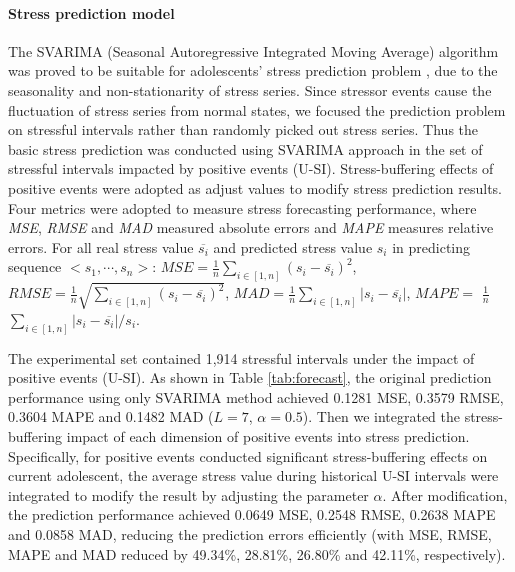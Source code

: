 \paragraph{Stress prediction model}
The SVARIMA (Seasonal Autoregressive Integrated Moving Average) algorithm was proved to be suitable for adolescents' stress prediction problem \citep{Li2015Predicting, Shumway2006Time},
due to the seasonality and non-stationarity of stress series.
Since stressor events cause the fluctuation of stress series from normal states,
we focused the prediction problem on stressful intervals rather than randomly picked out stress series.
Thus the basic stress prediction was conducted using SVARIMA approach in the set of stressful intervals impacted by positive events (U-SI).
Stress-buffering effects of positive events were adopted as adjust values to modify stress prediction results.
Four metrics were adopted to measure stress forecasting performance,
where \emph{MSE}, \emph{RMSE} and \emph{MAD} measured absolute errors and \emph{MAPE} measures relative errors.
For all real stress value $\overline{s_i}$ and predicted stress value $s_i$ in predicting sequence $<s_1,\cdots,s_n>$:
$MSE = \frac{1}{n}\sum_{i\in[1,n]}(s_i-\overline{s_i})^2$,
$RMSE = \frac{1}{n}\sqrt{\sum_{i\in[1,n]}(s_i-\overline{s_i})^2}$,
$MAD = \frac{1}{n}\sum_{i\in[1,n]}|s_i-\overline{s_i}|$,
$MAPE = $ $\frac{1}{n}$ $\sum_{i\in[1,n]}{|s_i-\overline{s_i}|/s_i}$.

The experimental set contained 1,914 stressful intervals under the impact of positive events (U-SI).
As shown in Table \ref{tab:forecast},
the original prediction performance using only SVARIMA method
achieved 0.1281 MSE, 0.3579 RMSE, 0.3604 MAPE and 0.1482 MAD ($L = 7$, $\alpha = 0.5$).
Then we integrated the stress-buffering impact of each dimension of positive events into stress prediction.
Specifically, for positive events conducted significant stress-buffering effects on current adolescent,
the average stress value during historical U-SI intervals were integrated to modify the result by adjusting the parameter $\alpha$.
After modification,
the prediction performance achieved 0.0649 MSE,	0.2548 RMSE, 0.2638 MAPE and 0.0858 MAD,
reducing the prediction errors efficiently (with MSE, RMSE, MAPE and MAD reduced by 49.34\%, 28.81\%, 26.80\% and 42.11\%, respectively).


